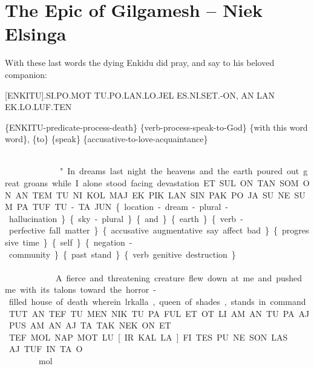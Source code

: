 {{\pagebreak
\section{The Epic of Gilgamesh -- {\small Niek Elsinga}}



\drie 
 

With these last words the dying Enkidu did pray, and say to his beloved companion:  
 
  [ENKITU].SI.PO.MOT TU.PO.LAN.LO.JEL ES.NI.SET.-ON, AN LAN EK.LO.LUF.TEN 

\{ENKITU-predicate-process-death\} \{verb-process-speak-to-God\} \{with this word word\}, \{to\} \{speak\} \{accusative-to-love-acquaintance\} 

\cartouche{\en\ki\tu}\si\po\mot~\tu\po\lan\lo\jel~~ \\ \es\Atlanni\set\on\comma \an\lan\ek\lo\luf\ten

\drie 
 

"In dreams last night the heavens and the earth poured out great groans while I alone stood facing devastation.  

ET.SUL.ON.TAN SOM.ON AN TEM TU.NI.KOL.MAJ EK.PIK.LAN.SIN.PAK PO.JA SU NE.SUM PA.TUF TU.-TA.JUN 

\{location-dream-plural-hallucination\} \{sky-plural\} \{and\} \{earth\} \{verb-perfective fall matter\} \{accusative augmentative say affect bad\} \{progressive time\} \{self\} \{negation-community\} \{past stand\} \{verb genitive destruction\} 

 
\et\sul\on\Atlantan\som\on~\an~\tem~\tu\Atlanni\kol\maj~\ek\pik\lan\Atlansin\pak \\ ~\po\ja \su \Atlanne\Atlansum~\pa\tuf~\tu\ta\jun 
 
\drie 

A fierce and threatening creature flew down at me and pushed me with its talons toward the horror-filled house of death wherein lrkalla, queen of shades, stands in command.  

TUT AN TEF.TU.MEN NIK TU.PA.FUL.ET.OT LI.AM AN TU.PA.AJ.PUS.AM AN AJ TA.TAK.NEK.ON ET \\TEF.MOL.NAP.MOT LU [IR.KAL.LA] FI.TES.PU.NE.SON.LAS \\AJ.TUF.IN.TA.O 

\tut ~ \an ~ \tef\tu\men ~ \nik ~ \tu\pa\ful\et\ot ~ \li\am ~ \an ~ \tu\pa\aj\pus\am ~ \an ~ \\ \aj ~ \ta\tak\nek\on ~ \et ~ \tef\mol\nap\mot ~ \lu ~ \cartouche{\il\kal\la} ~ \Atlanfi\tes\pu\Atlanne\son\las ~ \aj\tuf\Atlanin\ta\Atlano

}}
